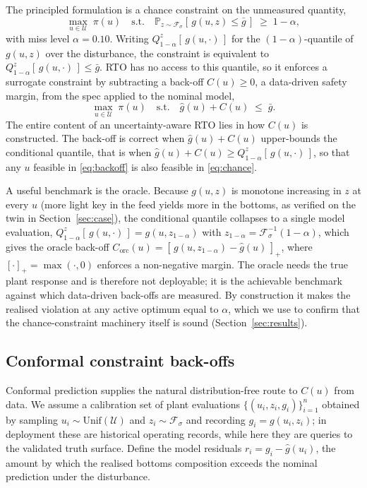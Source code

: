 The principled formulation is a chance constraint on the unmeasured quantity,
\begin{equation}
\max_{u\in\mathcal U}\; \pi(u)
\quad\text{s.t.}\quad
\mathbb{P}_{z\sim\mathcal F_\sigma}\!\left[\,g(u,z)\le \bar g\,\right]\;\ge\;1-\alpha,
\label{eq:chance}
\end{equation}
with miss level $\alpha=0.10$. Writing $Q^{z}_{1-\alpha}[\,g(u,\cdot)\,]$ for the
$(1-\alpha)$-quantile of $g(u,z)$ over the disturbance, the constraint is equivalent to
$Q^{z}_{1-\alpha}[\,g(u,\cdot)\,]\le\bar g$. RTO has no access to this quantile, so it
enforces a surrogate constraint by subtracting a back-off $C(u)\ge 0$, a data-driven safety
margin, from the spec applied to the nominal model,
\begin{equation}
\max_{u\in\mathcal U}\; \pi(u)
\quad\text{s.t.}\quad
\hat g(u) + C(u)\;\le\;\bar g .
\label{eq:backoff}
\end{equation}
The entire content of an uncertainty-aware RTO lies in how $C(u)$ is constructed. The
back-off is correct when $\hat g(u)+C(u)$ upper-bounds the conditional quantile, that is when
$\hat g(u)+C(u)\ge Q^{z}_{1-\alpha}[\,g(u,\cdot)\,]$, so that any $u$ feasible in
\eqref{eq:backoff} is also feasible in \eqref{eq:chance}.

A useful benchmark is the oracle. Because $g(u,z)$ is monotone increasing in $z$ at every $u$
(more light key in the feed yields more in the bottoms, as verified on the twin in
Section~\ref{sec:case}), the conditional quantile collapses to a single model evaluation,
$Q^{z}_{1-\alpha}[\,g(u,\cdot)\,] = g(u,z_{1-\alpha})$ with
$z_{1-\alpha}=\mathcal F_\sigma^{-1}(1-\alpha)$, which gives the oracle back-off
$C_{\mathrm{orc}}(u)=[\,g(u,z_{1-\alpha})-\hat g(u)\,]_+$, where $[\cdot]_+=\max(\cdot,0)$
enforces a non-negative margin. The oracle needs the true plant response and is therefore not
deployable; it is the achievable benchmark against which data-driven back-offs are measured.
By construction it makes the realised violation at any active optimum equal to $\alpha$,
which we use to confirm that the chance-constraint machinery itself is sound
(Section~\ref{sec:results}).

\subsection{Conformal constraint back-offs}
\label{sec:methods-backoffs}

Conformal prediction supplies the natural distribution-free route to $C(u)$ from data. We
assume a calibration set of plant evaluations $\{(u_i,z_i,g_i)\}_{i=1}^{n}$ obtained by
sampling $u_i\sim\mathrm{Unif}(\mathcal U)$ and $z_i\sim\mathcal F_\sigma$ and recording
$g_i=g(u_i,z_i)$; in deployment these are historical operating records, while here they are
queries to the validated truth surface. Define the model residuals $r_i=g_i-\hat g(u_i)$,
the amount by which the realised bottoms composition exceeds the nominal prediction under the
disturbance.


